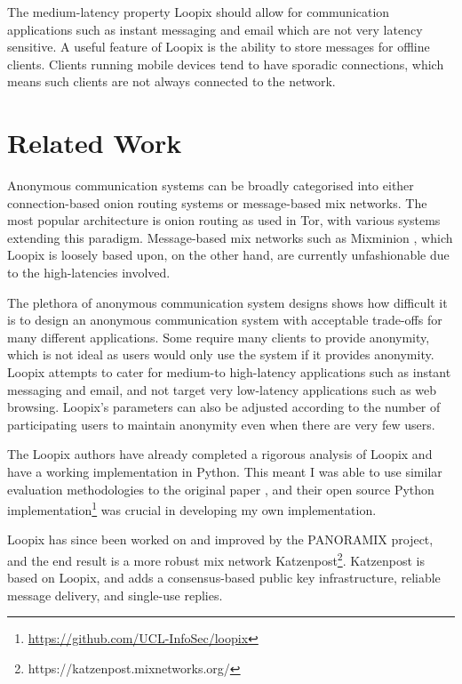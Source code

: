 \documentclass[final,dissertation.tex]{subfiles}
\begin{document}
The medium-latency property Loopix should allow for communication applications such as instant messaging and email which are not very latency sensitive. A useful feature of Loopix is the ability to store messages for offline clients. Clients running mobile devices tend to have sporadic connections, which means such clients are not always connected to the network.

\section{Related Work}

Anonymous communication systems can be broadly categorised into either connection-based onion routing systems or message-based mix networks. The most popular architecture is onion routing as used in Tor, with various systems extending this paradigm. Message-based mix networks such as Mixminion \cite{danezis2003mixminion}, which Loopix is loosely based upon, on the other hand, are currently unfashionable due to the high-latencies involved.

The plethora of anonymous communication system designs shows how difficult it is to design an anonymous communication system with acceptable trade-offs for many different applications. Some require many clients to provide anonymity, which is not ideal as users would only use the system if it provides anonymity. Loopix attempts to cater for medium-to high-latency applications such as instant messaging and email, and not target very low-latency applications such as web browsing. Loopix's parameters can also be adjusted according to the number of participating users to maintain anonymity even when there are very few users.

The Loopix authors have already completed a rigorous analysis of Loopix and have a working implementation in Python. This meant I was able to use similar evaluation methodologies to the original paper \cite{piotrowska2017loopix}, and their open source Python implementation\footnote{\url{https://github.com/UCL-InfoSec/loopix}} was crucial in developing my own implementation.

Loopix has since been worked on and improved by the PANORAMIX project, and the end result is a more robust mix network Katzenpost\footnote{https://katzenpost.mixnetworks.org/}. Katzenpost is based on Loopix, and adds a consensus-based public key infrastructure, reliable message delivery, and single-use replies.
\end{document}
